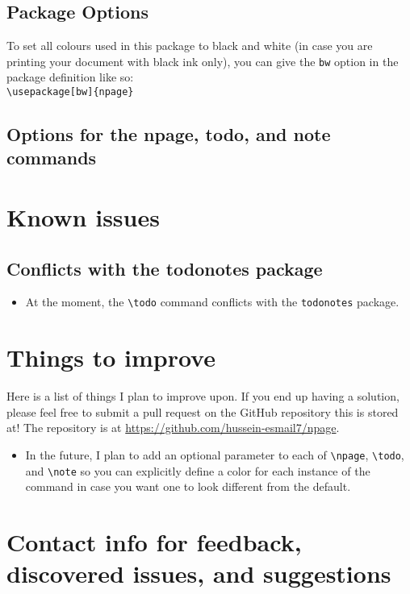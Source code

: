 \documentclass{article}
\begin{document}
\subsection{Package Options}

To set all colours used in this package to black and white (in case you are printing your document with black ink only), you can give the \texttt{bw} option in the package definition like so: \\
\texttt{\textbackslash{}usepackage[bw]\{npage\}}




\subsection{Options for the npage, todo, and note commands}

\section{Known issues}
\subsection{Conflicts with the todonotes package}
\begin{itemize}
	\item At the moment, the \texttt{\textbackslash{}todo{}} command conflicts
		with the \texttt{todonotes} package.
\end{itemize}

\section{Things to improve}
Here is a list of things I plan to improve upon. If you end up having a
solution, please feel free to submit a pull request on the GitHub repository
this is stored at! The repository is at
\href{https://github.com/hussein-esmail7/npage}{https://github.com/hussein-esmail7/npage}.
\begin{itemize}
	\item In the future, I plan to add an optional parameter to each of
		\texttt{\textbackslash{}npage}, \texttt{\textbackslash{}todo}, and
		\texttt{\textbackslash{}note} so you can explicitly define a color for
		each instance of the command in case you want one to look different
		from the default.
\end{itemize}

\section{Contact info for feedback, discovered issues, and suggestions}
\end{document}
